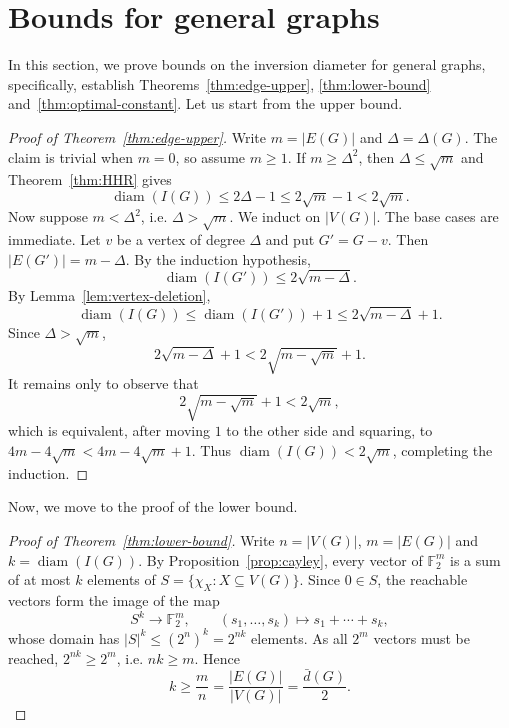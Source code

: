 \documentclass[11pt]{article}
\theoremstyle{remark}
\DeclareMathOperator{\diam}{diam}
\newcommand{\F}{\mathbb{F}}
\begin{document}
\section{Bounds for general graphs}\label{sec:edge-bounds}
 
 In this section, we  prove bounds on  the inversion diameter for general graphs, specifically,  establish  Theorems~\ref{thm:edge-upper}, \ref{thm:lower-bound} and~\ref{thm:optimal-constant}. Let us  start from the upper bound. 

\begin{proof}[Proof of Theorem~\ref{thm:edge-upper}]
Write $m=|E(G)|$ and $\Delta=\Delta(G)$.
The claim is trivial when $m=0$, so assume $m\ge1$.
If $m\ge\Delta^2$, then $\Delta\le\sqrt m$ and Theorem~\ref{thm:HHR} gives
\[
  \diam(I(G))\le2\Delta-1\le2\sqrt m-1<2\sqrt m.
\]
Now suppose $m<\Delta^2$, i.e. $\Delta>\sqrt m$.
We induct on $|V(G)|$.
The base cases are immediate.
Let $v$ be a vertex of degree $\Delta$ and put $G'=G-v$.
Then $|E(G')|=m-\Delta$.
By the induction hypothesis,
\[
  \diam(I(G'))\le2\sqrt{m-\Delta}.
\]
By Lemma~\ref{lem:vertex-deletion},
\[
  \diam(I(G))\le \diam(I(G'))+1\le2\sqrt{m-\Delta}+1.
\]
Since $\Delta>\sqrt m$,
\[
  2\sqrt{m-\Delta}+1<2\sqrt{m-\sqrt m}+1.
\]
It remains only to observe that
\[
  2\sqrt{m-\sqrt m}+1<2\sqrt m,
\]
which is equivalent, after moving $1$ to the other side and squaring, to
$4m-4\sqrt m<4m-4\sqrt m+1$.
Thus $\diam(I(G))<2\sqrt m$, completing the induction.
\end{proof}


 Now, we move to the proof of the lower bound. 

\begin{proof}[Proof of Theorem~\ref{thm:lower-bound}]
Write $n=|V(G)|$, $m=|E(G)|$ and $k=\diam(I(G))$.
By Proposition~\ref{prop:cayley}, every vector of $\F_2^m$ is a sum of at most $k$ elements of
$S=\{\chi_X:X\subseteq V(G)\}$.
Since $0\in S$,  the reachable vectors form the image of the map
\[
  S^k\longrightarrow\F_2^m,
  \qquad (s_1,\ldots,s_k)\longmapsto s_1+\cdots+s_k,
\]
whose domain has $|S|^k\le(2^n)^k=2^{nk}$ elements.
As all $2^m$ vectors must be reached, $2^{nk}\ge2^m$, i.e. $nk\ge m$.
Hence
\[
  k\ge \frac mn=\frac{|E(G)|}{|V(G)|}=\frac{\bar d(G)}2 .
\]
\end{proof}

\end{document}

